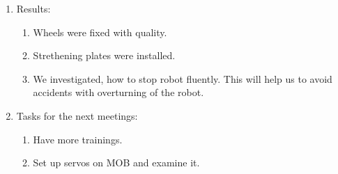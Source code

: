 \begin{enumerate}
\begin{enumerate}
	\end{enumerate}
	
	\item Results:
	\begin{enumerate}
		
		\item Wheels were fixed with quality.
		
		\item Strethening plates were installed.
		
        \item We investigated, how to stop robot fluently. This will help us to avoid accidents with overturning of the robot.
		
	\end{enumerate}
	
	\item Tasks for the next meetings:
	\begin{enumerate}
		
		\item Have more trainings.
		
		\item Set up servos on MOB and examine it.
			
	\end{enumerate}
\end{enumerate}
\fillpage
